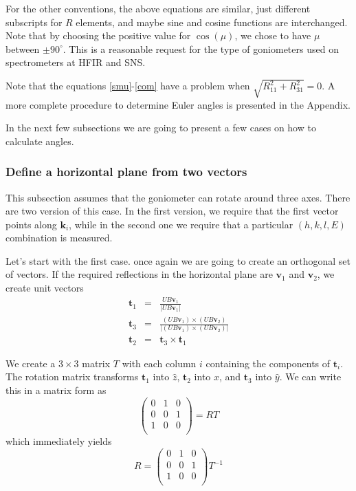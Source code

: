 \documentclass[prb]{revtex4}%
\begin{document}
For the other conventions, the above equations are similar, just different subscripts for $R$ elements, and maybe sine and
cosine functions are interchanged.
Note that by choosing the positive value for $\cos(\mu)$, we chose to have $\mu$ between $\pm90^\circ$. This is a
reasonable request for the type of goniometers used on spectrometers at HFIR and SNS.

Note that the equations \ref{smu}-\ref{com} have a problem when $\sqrt{R^2_{11}+R^2_{31}}=0$. A more complete
procedure to determine Euler angles is presented in the Appendix.


In the next few subsections we are going to present
a few cases on how to calculate angles.


\subsubsection{Define a horizontal plane from two vectors}
This subsection assumes that the goniometer can rotate around three axes.
There are two version of this case. In the first version, we require that the first vector points along $\textbf{k}_i$,
while in the second one we require that a particular $(h, k, l, E)$ combination is measured.

Let's start with the first case. once again we are going to create an orthogonal set of vectors. If the required
reflections in the horizontal plane are $\textbf{v}_1$ and $\textbf{v}_2$, we create unit vectors
\begin{eqnarray}
  \textbf{t}_1 &=& \frac{UB\textbf{v}_1}{|UB\textbf{v}_1|} \\
  \textbf{t}_3 &=& \frac{(UB\textbf{v}_1)\times(UB\textbf{v}_2)}{|(UB\textbf{v}_1)\times(UB\textbf{v}_2)|} \\
  \textbf{t}_2 &=& \textbf{t}_3\times\textbf{t}_1
\end{eqnarray}

We create a $3\times3$ matrix $T$ with each column $i$ containing the components of $\textbf{t}_i$. The rotation
matrix transforms $\textbf{t}_1$ into $\widehat{z}$, $\textbf{t}_2$ into $\widehat{x}$, and $\textbf{t}_3$ into $\widehat{y}$.
We can write this in a matrix form as
\begin{equation}\label{RT}
    \left(
      \begin{array}{ccc}
        0 & 1 & 0 \\
        0 & 0 & 1 \\
        1 & 0 & 0 \\
      \end{array}
    \right)
    = R T
\end{equation}
which immediately yields
\begin{equation}
    R=\left(
      \begin{array}{ccc}
        0 & 1 & 0 \\
        0 & 0 & 1 \\
        1 & 0 & 0 \\
      \end{array}
    \right)T^{-1}
\end{equation}
\end{document}
